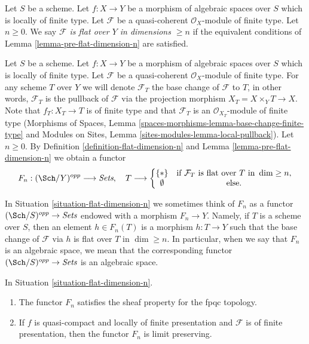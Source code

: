 \begin{definition}
\label{definition-flat-dimension-n}
Let $S$ be a scheme. Let $f : X \to Y$ be a morphism of algebraic spaces
over $S$ which is locally of finite type.
Let $\mathcal{F}$ be a quasi-coherent $\mathcal{O}_X$-module of finite type.
Let $n \geq 0$.
We say {\it $\mathcal{F}$ is flat over $Y$ in dimensions $\geq n$}
if the equivalent conditions of Lemma \ref{lemma-pre-flat-dimension-n}
are satisfied.
\end{definition}

\begin{situation}
\label{situation-flat-dimension-n}
Let $S$ be a scheme. Let $f : X \to Y$ be a morphism of algebraic spaces
over $S$ which is locally of finite type. Let $\mathcal{F}$ be a quasi-coherent
$\mathcal{O}_X$-module of finite type. For any scheme $T$ over $Y$ we will
denote $\mathcal{F}_T$ the base change of $\mathcal{F}$ to $T$, in other words,
$\mathcal{F}_T$ is the pullback of $\mathcal{F}$ via the projection morphism
$X_T = X \times_Y T \to X$. Note that $f_T : X_T \to T$ is of finite type
and that $\mathcal{F}_T$ is an $\mathcal{O}_{X_T}$-module of finite type
(Morphisms of Spaces, Lemma
\ref{spaces-morphisms-lemma-base-change-finite-type}
and
Modules on Sites, Lemma \ref{sites-modules-lemma-local-pullback}).
Let $n \geq 0$. By Definition \ref{definition-flat-dimension-n} and
Lemma \ref{lemma-pre-flat-dimension-n} we obtain a functor
\begin{equation}
\label{equation-flat-dimension-n}
F_n : (\Sch/Y)^{opp} \longrightarrow \textit{Sets}, \quad
T \longrightarrow \left\{
\begin{matrix}
\{*\} & \text{if }\mathcal{F}_T\text{ is flat over }T\text{ in }\dim \geq n, \\
\emptyset & \text{else.}
\end{matrix}
\right.
\end{equation}
\end{situation}

\noindent
In Situation \ref{situation-flat-dimension-n} we sometimes think of
$F_n$ as a functor $(\Sch/S)^{opp} \to \textit{Sets}$ endowed with a morphism
$F_n \to Y$. Namely, if $T$ is a scheme over $S$, then
an element $h \in F_n(T)$ is a morphism $h : T \to Y$
such that the base change of $\mathcal{F}$ via $h$ is flat over $T$
in $\dim \geq n$. In particular, when we say
that $F_n$ is an algebraic space, we mean that the corresponding
functor $(\Sch/S)^{opp} \to \textit{Sets}$ is an algebraic space.

\begin{lemma}
\label{lemma-flat-dimension-n}
In Situation \ref{situation-flat-dimension-n}.
\begin{enumerate}
\item The functor $F_n$ satisfies the sheaf property for the fpqc topology.
\item If $f$ is quasi-compact and locally of finite presentation
and $\mathcal{F}$ is of finite presentation, then the functor $F_n$ is
limit preserving.
\end{enumerate}
\end{lemma}


